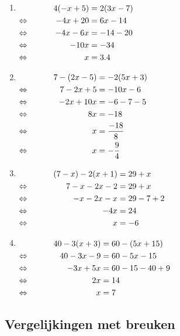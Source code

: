 \documentclass{bis}
\begin{document}
\begin{solution}
\begin{enumerate}
\item $\begin{aligned}[t]
     && 4(- x + 5)	&= 2(3x - 7)\\
\Leftrightarrow\mkern40mu &&   - 4x + 20	&= 6x - 14\\
\Leftrightarrow\mkern40mu &&   - 4x - 6x	&= -14 - 20\\
\Leftrightarrow\mkern40mu &&   - 10x	&= -34\\
\Leftrightarrow\mkern40mu &&   x	&= 3.4\\
\end{aligned}$
\item $\begin{aligned}[t]
     && 7 - (2x - 5)	&= - 2(5x + 3)\\
\Leftrightarrow\mkern40mu && 7 - 2x + 5	&= - 10x - 6\\
\Leftrightarrow\mkern40mu && - 2x + 10x	&= - 6 - 7 - 5\\
\Leftrightarrow\mkern40mu && 8x	&= - 18\\
\Leftrightarrow\mkern40mu && x	&= \dfrac{-18}{8}\\
\Leftrightarrow\mkern40mu && x	&= -\dfrac{9}{4}\\
\end{aligned}$
\item $\begin{aligned}[t]
     && (7 - x) - 2(x + 1)	&= 29 + x\\
\Leftrightarrow\mkern40mu && 7 - x - 2x - 2	&= 29 + x\\
\Leftrightarrow\mkern40mu && - x - 2x - x	&= 29 - 7 + 2\\
\Leftrightarrow\mkern40mu && - 4x	&= 24\\
\Leftrightarrow\mkern40mu && x	&= - 6\\
\end{aligned}$
\item $\begin{aligned}[t]
     && 40 - 3(x + 3)	&= 60 - (5x + 15)\\
\Leftrightarrow\mkern40mu && 40 - 3x - 9	&= 60 - 5x - 15\\
\Leftrightarrow\mkern40mu && - 3x + 5x	&= 60 - 15 - 40 + 9\\
\Leftrightarrow\mkern40mu && 2x	&= 14\\
\Leftrightarrow\mkern40mu && x	&= 7\\
\end{aligned}$
\end{enumerate}
\end{solution}

\subsection{Vergelijkingen met breuken}
\end{document}
